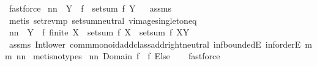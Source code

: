\begin{isabellebody}
\ fastforce%
\endisatagproof
{\isafoldproof}%
%
\isadelimproof
\isanewline
%
\endisadelimproof
{}\isamarkupfalse%
\ nn{}{}{\isacharcolon}\ \ {\isachardoublequoteopen}Y\ {\isasymsubseteq}\ f{\isacharminus}{\isacharbackquote}{\isacharbraceleft}{}{\isacharbraceright}{\isachardoublequoteclose}\ \ {\isachardoublequoteopen}setsum\ f\ Y{\isacharequal}{}{\isachardoublequoteclose}%
\isadelimproof
\ %
\endisadelimproof
%
\isatagproof
{}\isamarkupfalse%
\ assms\ \isanewline
{}\isamarkupfalse%
\ {\isacharparenleft}metis\ set{\isacharunderscore}rev{\isacharunderscore}mp\ setsum{\isachardot}neutral\ vimage{\isacharunderscore}singleton{\isacharunderscore}eq{\isacharparenright}%
\endisatagproof
{\isafoldproof}%
%
\isadelimproof
%
\endisadelimproof
\isanewline
\isanewline
{}\isamarkupfalse%
\ nn{}{}{\isacharcolon}\ \ {\isachardoublequoteopen}Y\ {\isasymsubseteq}\ f{\isacharminus}{\isacharbackquote}{\isacharbraceleft}{}{\isacharbraceright}{\isachardoublequoteclose}\ {\isachardoublequoteopen}finite\ X{\isachardoublequoteclose}\ \ {\isachardoublequoteopen}setsum\ f\ X\ {\isacharequal}\ setsum\ f\ {\isacharparenleft}X{\isacharminus}Y{\isacharparenright}{\isachardoublequoteclose}\ \isanewline
%
\isadelimproof
%
\endisadelimproof
%
\isatagproof
{}\isamarkupfalse%
\ assms\ Int{\isacharunderscore}lower{}\ comm{\isacharunderscore}monoid{\isacharunderscore}add{\isacharunderscore}class{\isachardot}add{\isachardot}right{\isacharunderscore}neutral\ inf{\isachardot}boundedE\ inf{\isachardot}orderE\ mm{}{}\ nn{}{}\isanewline
{}\isamarkupfalse%
\ {\isacharparenleft}metis{\isacharparenleft}no{\isacharunderscore}types{\isacharparenright}{\isacharparenright}%
\endisatagproof
{\isafoldproof}%
%
\isadelimproof
\isanewline
%
\endisadelimproof
\isanewline
{}\isamarkupfalse%
\ nn{}{}{\isacharcolon}\ {\isachardoublequoteopen}{\isacharminus}{\isacharparenleft}Domain\ f{\isacharparenright}\ {\isasymsubseteq}\ {\isacharparenleft}f\ Else\ {}{\isacharparenright}{\isacharminus}{\isacharbackquote}{\isacharbraceleft}{}{\isacharbraceright}{\isachardoublequoteclose}%
\isadelimproof
\ %
\endisadelimproof
%
\isatagproof
{}\isamarkupfalse%
\ fastforce%
\endisatagproof
{\isafoldproof}%
%
\isadelimproof
%
\endisadelimproof
\isanewline

\end{isabellebody}
